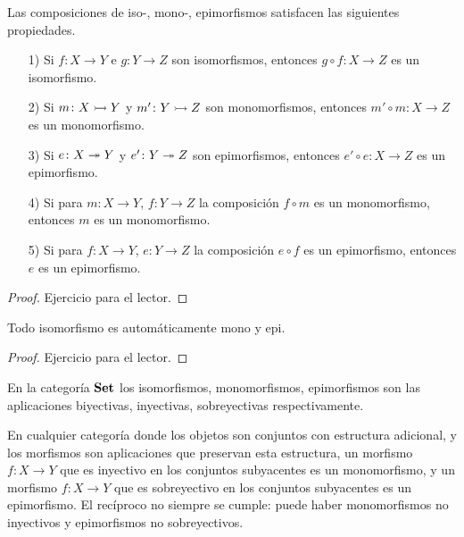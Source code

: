 \documentclass{article}
\numberwithin{equation}{section}
\theoremstyle{definition}
\begin{document}
\begin{observacion}
  Las composiciones de iso-, mono-, epimorfismos satisfacen las siguientes
  propiedades.

  \begin{enumerate}
  \item[1)] Si $f\colon X\to Y$ e $g\colon Y\to Z$ son isomorfismos, entonces
    $g\circ f\colon X\to Z$ es un isomorfismo.

  \item[2)] Si $m\colon X\rightarrowtail Y$ y $m'\colon Y\rightarrowtail Z$ son monomorfismos,
    entonces $m'\circ m\colon X\to Z$ es un monomorfismo.

  \item[3)] Si $e\colon X\twoheadrightarrow Y$ y $e'\colon Y\twoheadrightarrow Z$ son epimorfismos, entonces
    $e'\circ e\colon X\to Z$ es un epimorfismo.

  \item[4)] Si para $m\colon X\to Y$, $f\colon Y\to Z$ la composición $f\circ m$
    es un monomorfismo, entonces $m$ es un monomorfismo.

  \item[5)] Si para $f\colon X\to Y$, $e\colon Y\to Z$ la composición $e\circ f$
    es un epimorfismo, entonces $e$ es un epimorfismo.
  \end{enumerate}

  \begin{proof}
    Ejercicio para el lector.
  \end{proof}
\end{observacion}

\begin{observacion}
  Todo isomorfismo es automáticamente mono y epi.

  \begin{proof}
    Ejercicio para el lector.
  \end{proof}
\end{observacion}

\begin{ejemplo}
  En la categoría $\text{\bf Set}$ los isomorfismos, monomorfismos, epimorfismos
  son las aplicaciones biyectivas, inyectivas, sobreyectivas respectivamente.
\end{ejemplo}

En cualquier categoría donde los objetos son conjuntos con estructura adicional,
y los morfismos son aplicaciones que preservan esta estructura, un morfismo
$f\colon X\to Y$ que es inyectivo en los conjuntos subyacentes es un
monomorfismo, y un morfismo $f\colon X\to Y$ que es sobreyectivo en los
conjuntos subyacentes es un epimorfismo. El recíproco no siempre se cumple:
puede haber monomorfismos no inyectivos y epimorfismos no sobreyectivos.
\end{document}
